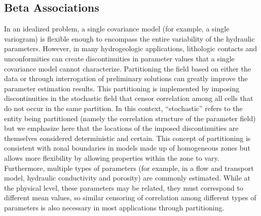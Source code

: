 \documentclass[11pt,oneside,onecolumn]{usgsreport}
\begin{document}
\begin{multicols}{2}


\subsection{\label{sub:Correlation-Zones}Beta Associations}

In an idealized problem, a single covariance model (for example, a
single variogram) is flexible enough to encompass the entire variability
of the hydraulic parameters. However, in many hydrogeologic applications,
lithologic contacts and unconformities can create discontinuities
in parameter values that a single covariance model cannot characterize.
Partitioning the field based on either the data \citep[e.g. ][]{fienenEtal2004}
or through interrogation of preliminary solutions \citep[e.g. ][]{FienenWRR2008}
can greatly improve the parameter estimation results. This partitioning
is implemented by imposing discontinuities in the stochastic field
that censor correlation among all cells that do not occur in the same
partition. In this context, ``stochastic'' refers to the entity
being partitioned (namely the correlation structure of the parameter
field) but we emphasize here that the locations of the imposed discontinuities
are themselves considered deterministic and certain. This concept
of partitioning is consistent with zonal boundaries in models made
up of homogeneous zones but allows more flexibility by allowing properties
within the zone to vary. Furthermore, multiple types of parameters
(for example, in a flow and transport model, hydraulic conductivity
and porosity) are commonly estimated. While at the physical level,
these parameters may be related, they must correspond to different
mean values, so similar censoring of correlation among different types
of parameters is also necessary in most applications through partitioning.


\end{multicols}
\end{document}
